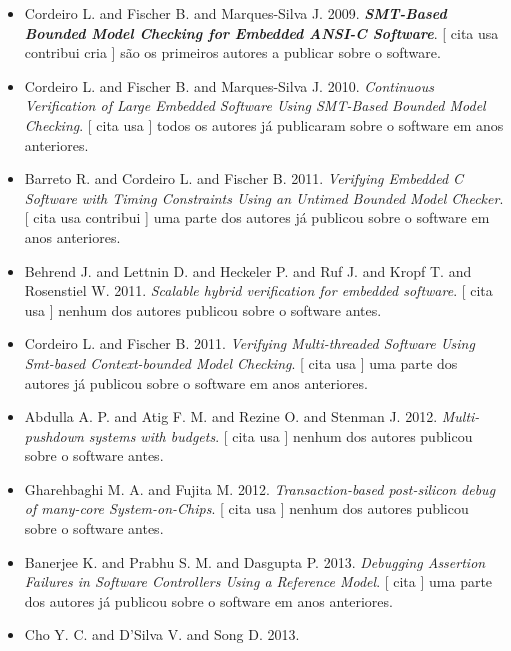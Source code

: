 \begin{itemize}
\item Cordeiro L. and Fischer B. and Marques-Silva J.
      2009.
        \textbf{\textit{ SMT-Based Bounded Model Checking for Embedded ANSI-C Software}}.
      [
          cita
          usa
          contribui
          cria
      ]
são os primeiros autores a publicar sobre o software.
\item Cordeiro L. and Fischer B. and Marques-Silva J.
      2010.
        \textit{ Continuous Verification of Large Embedded Software Using SMT-Based Bounded Model Checking}.
      [
          cita
          usa
      ]
todos os autores já publicaram sobre o software em anos anteriores.
\item Barreto R. and Cordeiro L. and Fischer B.
      2011.
        \textit{ Verifying Embedded C Software with Timing Constraints Using an Untimed Bounded Model Checker}.
      [
          cita
          usa
          contribui
      ]
uma parte dos autores já publicou sobre o software em anos anteriores.
\item Behrend J. and Lettnin D. and Heckeler P. and Ruf J. and Kropf T. and Rosenstiel W.
      2011.
        \textit{ Scalable hybrid verification for embedded software}.
      [
          cita
          usa
      ]
nenhum dos autores publicou sobre o software antes.
\item Cordeiro L. and Fischer B.
      2011.
        \textit{ Verifying Multi-threaded Software Using Smt-based Context-bounded Model Checking}.
      [
          cita
          usa
      ]
uma parte dos autores já publicou sobre o software em anos anteriores.
\item Abdulla A. P. and Atig F. M. and Rezine O. and Stenman J.
      2012.
        \textit{ Multi-pushdown systems with budgets}.
      [
          cita
          usa
      ]
nenhum dos autores publicou sobre o software antes.
\item Gharehbaghi M. A. and Fujita M.
      2012.
        \textit{ Transaction-based post-silicon debug of many-core System-on-Chips}.
      [
          cita
          usa
      ]
nenhum dos autores publicou sobre o software antes.
\item Banerjee K. and Prabhu S. M. and Dasgupta P.
      2013.
        \textit{ Debugging Assertion Failures in Software Controllers Using a Reference Model}.
      [
          cita
      ]
uma parte dos autores já publicou sobre o software em anos anteriores.
\item Cho Y. C. and D'Silva V. and Song D.
      2013.

\end{itemize}
